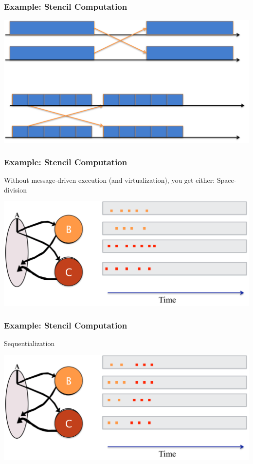 \begin{frame}[t]
\frametitle{Example: Stencil Computation}
  \begin{center} \includegraphics[width=\textwidth]{figures/stencil_timeline} \end{center}
\end{frame}

\begin{frame}[t]
\frametitle{Example: Stencil Computation}
Without message-driven execution (and virtualization), you get either: Space-division

  \begin{center} \includegraphics[width=\textwidth]{figures/stencil_space} \end{center}
\end{frame}

\begin{frame}[t]
\frametitle{Example: Stencil Computation}
Sequentialization

  \begin{center} \includegraphics[width=\textwidth]{figures/stencil_seq} \end{center}
\end{frame}

